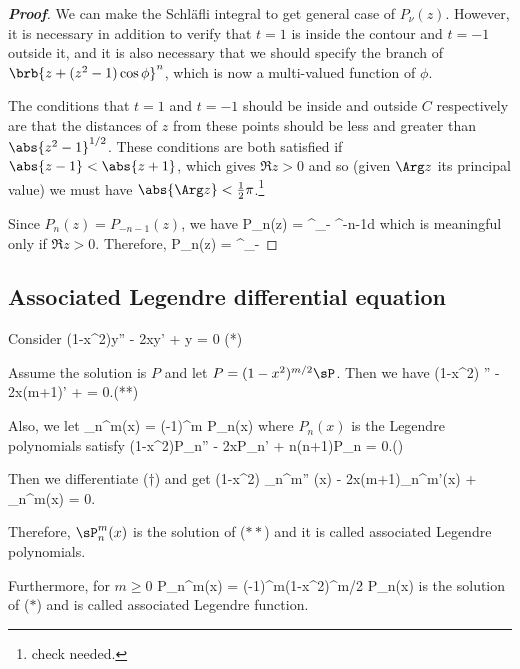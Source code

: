 \begin{proof}[\bf Proof]
We can make the Schl\"afli integral to get general case of $P_\nu(z)$. However, it is necessary in addition to verify that $t=1$ is inside the contour and $t=-1$ outside it, and it is also necessary that we should specify the branch of $\brb{z+ (z^2-1)\cos\phi}^n$, which is now a multi-valued function of $\phi$.

The conditions that $t=1$ and $t=-1$ should be inside and outside $C$ respectively are that the distances of $z$ from these points should be less and greater than $\abs{z^2-1}^{1/2}$. These conditions are both satisfied if $\abs{z-1} < \abs{z+1}$, which gives $\Re z>0$ and so (given $\Arg z$ its principal value) we must have $\abs{\Arg z} < \frac 12 \pi$.\footnote{check needed.}

Since $P_n(z) = P_{-n-1}(z)$, we have
\be
P_{n}(z) =  \int^{\pi}_{-\pi} ^{-n-1}d\phi
\ee
which is meaningful only if $\Re z>0$. %
Therefore,
\be
P_{n}(z) =  \int^{\pi}_{-\pi} 
\ee
\end{proof}

\subsection{Associated Legendre differential equation}

Consider
\be
(1-x^2)y'' - 2xy' + y = 0 \qquad (*)
\ee

Assume the solution is $P$ and let $P = (1-x^2)^{m/2} \sP$. Then we have
\be
(1-x^2) \sP'' - 2x(m+1)\sP' + \sP = 0.\qquad (**)
\ee

Also, we let
\be
\sP_n^m(x) = (-1)^m P_n(x)
\ee
where $P_n(x)$ is the Legendre polynomials satisfy
\be
(1-x^2)P_n'' - 2xP_n' + n(n+1)P_n = 0.\qquad (\dag)
\ee

Then we differentiate ($\dag$) and get
\be
(1-x^2) {\sP_n^m}'' (x) - 2x(m+1){\sP_n^m}'(x) + \sP_n^m(x) = 0.
\ee

Therefore, $\sP_n^m(x)$ is the solution of ($**$) and it is called associated Legendre polynomials.

Furthermore, for $m\geq 0$
\be
P_n^m(x) = (-1)^m(1-x^2)^{m/2} P_n(x)
\ee
is the solution of ($*$) and is called associated Legendre function.

